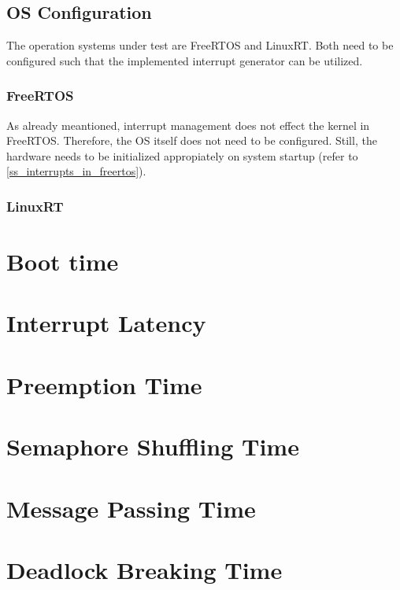 \subsection{\ac{OS} Configuration}
The operation systems under test are FreeRTOS and LinuxRT.
Both need to be configured such that the implemented interrupt generator can be utilized.

\subsubsection{FreeRTOS}
As already meantioned, interrupt management does not effect the kernel in FreeRTOS.
Therefore, the \ac{OS} itself does not need to be configured.
Still, the hardware needs to be initialized appropiately on system startup (refer to \ref{ss_interrupts_in_freertos}). 

\subsubsection{LinuxRT}



\section{Boot time}
\section{Interrupt Latency}
\section{Preemption Time}
\section{Semaphore Shuffling Time}
\section{Message Passing Time}
\section{Deadlock Breaking Time}